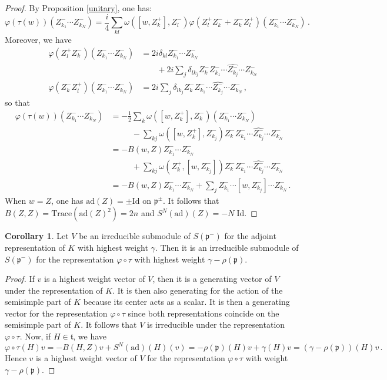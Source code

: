 \documentclass{amsart}[draft,11pt]
\newcommand{\fp}{{\mathfrak{p}}}
\numberwithin{equation}{section}
\theoremstyle{definition}
\newtheorem{corollary}[theorem]{Corollary}
\begin{document}
\begin{proof}
By Proposition \ref{unitary}, one has:
$$
\varphi(\tau(w))(Z_{k_1}^-\cdots Z_{k_N}^-)
=\frac{i}4\sum_{kl}
\omega([w,Z_k^+],Z_l^-)
\varphi(Z_l^+Z_k^-+Z_k^-Z_l^+)
(Z_{k_1}^-\cdots Z_{k_N}^-)\,.
$$
Moreover, we have
\begin{align*}
    \varphi(Z_l^+Z_k^-)(Z_{k_1}^-\cdots Z_{k_N}^-)
    &=2i\delta_{kl}Z_{k_1}^-\cdots Z_{k_N}^- \\
    &\phantom{2i\delta_{kl}}+2i\sum_{j}\delta_{lk_j}Z_k^-
    Z_{k_1}^-\cdots\widehat{Z_{k_j}^-}\cdots Z_{k_N}^- \\
    \varphi(Z_k^-Z_l^+)(Z_{k_1}^-\cdots Z_{k_N}^-)
    &=2i\sum_j \delta_{lk_j}Z_k^-
    Z_{k_1}^-\cdots\widehat{Z_{k_j}^-}\cdots Z_{k_N}^-\,,
\end{align*}
so that
\begin{align*}
    \varphi(\tau(w))(Z_{k_1}^-\cdots Z_{k_N}^-)
&= -\frac12\sum_k\omega([w,Z_k^+],Z_k^-)
(Z_{k_1}^-\cdots Z_{k_N}^-) \\
&\phantom{=-\frac12}-\sum_{kj} \omega([w,Z_k^+],Z_{k_j}^-)Z_k^-Z_{k_1}^-\cdots \widehat{Z_{k_j}^-}\cdots Z_{k_N}^- \\
&=-B(w,Z)Z_{k_1}^-\cdots Z_{k_N}^- \\
&\phantom{=-\frac12}
+\sum_{kj} \omega(Z_k^+,[w,Z_{k_j}^-])Z_k^-Z_{k_1}^-\cdots \widehat{Z_{k_j}^-}\cdots Z_{k_N}^- \\
&=-B(w,Z)Z_{k_1}^-\cdots Z_{k_N}^- +\sum_j Z_{k_1}^-\cdots 
[w,Z_{k_j}^-]\cdots Z_{k_N}^- \,.
\end{align*}
When $w=Z$, one has $\mathrm{ad}(Z)=\pm \mathrm{Id}$ on $\fp^\pm$. It follows that
$B(Z,Z) = \mathrm{Trace} (\mathrm{ad}(Z)^2)
=2n$ and $S^N(\mathrm{ad})(Z)=-N\;\mathrm{Id}$.
\end{proof}

\begin{corollary}
\label{shift}
Let $V$ be an irreducible submodule 
of $S(\fp^-)$ for the adjoint representation of $K$ with highest weight $\gamma$. Then it is an irreducible submodule of $S(\fp^-)$ for the representation $\varphi \circ \tau$ with highest weight $\gamma-\rho(\fp)$.
\end{corollary}
\begin{proof}
If $v$ is a highest weight vector of $V$,
then it is a generating vector of $V$ under the representation of $K$. It is then also
generating for the action of the semisimple part of $K$ because its center acts as a scalar. It is then a generating vector for the representation 
$\varphi \circ \tau$ since both representations
coincide on the semisimple part of $K$. It follows that $V$ is irreducible under the representation $\varphi \circ \tau$. Now, if $H \in \mathfrak{t}$, we have
$$
\varphi\circ\tau (H)v=-B(H,Z)v+S^N(\mathrm{ad})(H)(v)=
-\rho(\fp)(H)v+\gamma(H)v= (\gamma-\rho(\fp))(H)v \,.
$$
Hence $v$ is a highest weight vector of $V$ for the representation $\varphi \circ \tau$ with weight $\gamma-\rho(\fp)$.
\end{proof}
\end{document}
